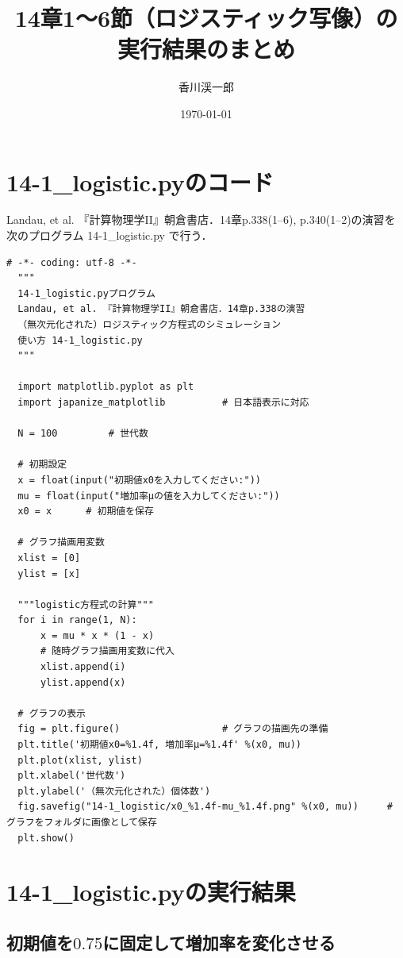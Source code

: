 \documentclass[a4paper, oneside]{jsarticle}
\begin{document}
\title{14章1〜6節（ロジスティック写像）の実行結果のまとめ}
\author{香川渓一郎}
\date{\today}

\maketitle

\setcounter{tocdepth}{1}
\tableofcontents

\section{14-1\_logistic.pyのコード}

Landau, et al. 『計算物理学II』朝倉書店．14章p.338(1--6), p.340(1--2)の演習を次のプログラム 14-1\_logistic.py で行う．

\begin{lstlisting}[caption=14-1\_logistic.py, label=logistic]
  # -*- coding: utf-8 -*-
  """
  14-1_logistic.pyプログラム
  Landau, et al. 『計算物理学II』朝倉書店．14章p.338の演習
  （無次元化された）ロジスティック方程式のシミュレーション
  使い方 14-1_logistic.py
  """

  import matplotlib.pyplot as plt
  import japanize_matplotlib          # 日本語表示に対応
  
  N = 100         # 世代数
  
  # 初期設定
  x = float(input("初期値x0を入力してください:"))
  mu = float(input("増加率μの値を入力してください:"))
  x0 = x      # 初期値を保存
  
  # グラフ描画用変数
  xlist = [0]
  ylist = [x]
  
  """logistic方程式の計算"""
  for i in range(1, N):
      x = mu * x * (1 - x)
      # 随時グラフ描画用変数に代入
      xlist.append(i)
      ylist.append(x)
  
  # グラフの表示
  fig = plt.figure()                  # グラフの描画先の準備
  plt.title('初期値x0=%1.4f, 増加率μ=%1.4f' %(x0, mu))
  plt.plot(xlist, ylist)
  plt.xlabel('世代数')
  plt.ylabel('（無次元化された）個体数')
  fig.savefig("14-1_logistic/x0_%1.4f-mu_%1.4f.png" %(x0, mu))     # グラフをフォルダに画像として保存
  plt.show()
\end{lstlisting}

\section{14-1\_logistic.pyの実行結果}
\subsection{初期値を$0.75$に固定して増加率を変化させる}
\end{document}
